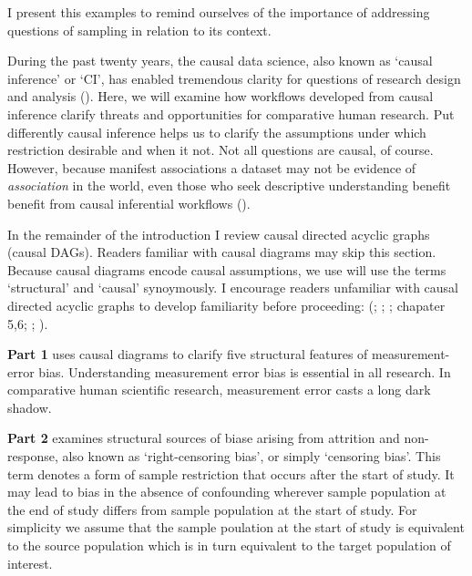 \documentclass[
  single column]{article}
\begin{document}
I present this examples to remind ourselves of the importance of
addressing questions of sampling in relation to its context.

During the past twenty years, the causal data science, also known as
`causal inference' or `CI', has enabled tremendous clarity for questions
of research design and analysis
().
Here, we will examine how workflows developed from causal inference
clarify threats and opportunities for comparative human research. Put
differently causal inference helps us to clarify the assumptions under
which restriction desirable and when it not. Not all questions are
causal, of course. However, because manifest associations a dataset may
not be evidence of \emph{association} in the world, even those who seek
descriptive understanding benefit benefit from causal inferential
workflows ().

In the remainder of the introduction I review causal directed acyclic
graphs (causal DAGs). Readers familiar with causal diagrams may skip
this section. Because causal diagrams encode causal assumptions, we use
will use the terms `structural' and `causal' synoymously. I encourage
readers unfamiliar with causal directed acyclic graphs to develop
familiarity before proceeding: (; ;
;
 chapater 5,6;
;
).

\textbf{Part 1} uses causal diagrams to clarify five structural features
of measurement-error bias. Understanding measurement error bias is
essential in all research. In comparative human scientific research,
measurement error casts a long dark shadow.

\textbf{Part 2} examines structural sources of biase arising from
attrition and non-response, also known as `right-censoring bias', or
simply `censoring bias'. This term denotes a form of sample restriction
that occurs after the start of study. It may lead to bias in the absence
of confounding wherever sample population at the end of study differs
from sample population at the start of study. For simplicity we assume
that the sample poulation at the start of study is equivalent to the
source population which is in turn equivalent to the target population
of interest.
\end{document}
